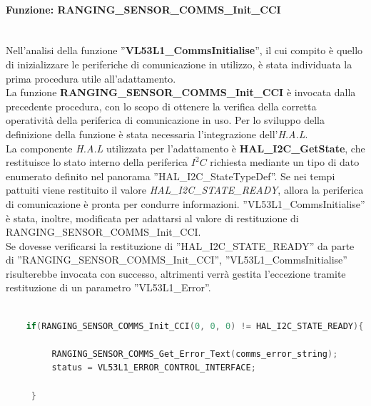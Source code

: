 \paragraph{Funzione: RANGING\_SENSOR\_COMMS\_Init\_CCI}\mbox{}\\
Nell'analisi della funzione ''\textbf{VL53L1\_CommsInitialise}'', il cui compito è quello di inizializzare le periferiche di comunicazione in utilizzo, è stata individuata la prima procedura utile all'adattamento.\\
La funzione \textbf{RANGING\_SENSOR\_COMMS\_Init\_CCI} è invocata dalla precedente procedura, con lo scopo di ottenere la verifica della corretta operatività della periferica di comunicazione in uso. Per lo sviluppo
della definizione della funzione è stata necessaria l'integrazione dell'\textit{H.A.L}.\\
La componente \textit{H.A.L} utilizzata per l'adattamento è \textbf{HAL\_I2C\_GetState}, che restituisce lo stato interno della periferica $I^2C$ richiesta mediante un tipo di dato enumerato definito nel panorama ''HAL\_I2C\_StateTypeDef''. 
Se nei tempi pattuiti viene restituito il valore \textit{HAL\_I2C\_STATE\_READY}, allora la periferica di comunicazione è pronta per condurre informazioni.
''VL53L1\_CommsInitialise'' è stata, inoltre, modificata per adattarsi al valore di restituzione di\\
RANGING\_SENSOR\_COMMS\_Init\_CCI.\\
Se dovesse verificarsi la restituzione di ''HAL\_I2C\_STATE\_READY'' da parte di ''RANGING\_SENSOR\_COMMS\_Init\_CCI'', ''VL53L1\_CommsInitialise'' risulterebbe invocata con successo, altrimenti verrà gestita l'eccezione tramite 
restituzione di un parametro ''VL53L1\_Error''.\\



\begin{lstlisting}[language=Cpp, caption={\footnotesize Dettaglio dell'implementazione di \textit{RANGING\_SENSOR\_COMMS\_Init\_CCI} in \textit{VL53L1\_CommsInitialise}}]
    
    if(RANGING_SENSOR_COMMS_Init_CCI(0, 0, 0) != HAL_I2C_STATE_READY){
 
         RANGING_SENSOR_COMMS_Get_Error_Text(comms_error_string);
         status = VL53L1_ERROR_CONTROL_INTERFACE;
 
     }
 \end{lstlisting}

